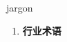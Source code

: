 
\begin{frame}
{\huge jargon}
\begin{center}
\begin{enumerate}\Large
  \item \textbf{行业术语}
\end{enumerate}
\end{center}
\end{frame}
